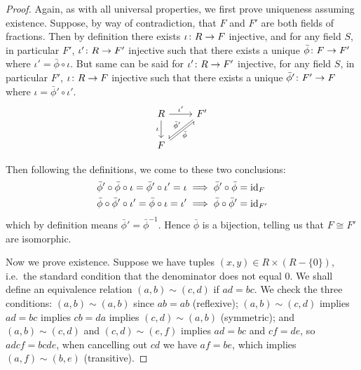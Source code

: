 \begin{proof}
    Again, as with all universal properties,
    we first prove uniqueness assuming existence.
    Suppose, by way of contradiction,
    that \(F\) and \(F'\) are both fields of fractions.
    Then by definition there exists \(\iota\colon R\to F\) injective,
    and for any field \(S\), in particular \(F'\),
    \(\iota'\colon R\to F'\) injective
    such that there exists a unique \(\bar{\phi}\colon F\to F'\)
    where \(\iota' = \bar{\phi}\circ\iota\).
    But same can be said for \(\iota'\colon R\to F'\) injective,
    for any field \(S\), in particular \(F'\),
    \(\iota\colon R\to F\) injective
    such that there exists a unique \(\bar{\phi}'\colon F'\to F\)
    where \(\iota = \bar{\phi}'\circ\iota'\).
    \begin{equation*}
        \begin{tikzcd}
            R \arrow{r}{\iota'} \arrow{d}[swap]{\iota} &
            F' \arrow[rightharpoondown, shift right=0.25ex]{ld}%
                [xshift=.5ex, yshift=-.5ex, swap]{\bar{\phi}'} \\
            F \arrow[rightharpoondown, shift right=0.25ex]{ru}%
                [xshift=-.5ex, yshift=.5ex, swap]{\bar{\phi}}
        \end{tikzcd}
    \end{equation*}

    Then following the definitions,
    we come to these two conclusions:
    \begin{align*}
        \bar{\phi}'\circ\bar{\phi}\circ\iota = \bar{\phi}'\circ\iota' = \iota
        &\implies \bar{\phi}'\circ\bar{\phi} = \operatorname{id}_F \\
        \bar{\phi}\circ\bar{\phi}'\circ\iota' = \bar{\phi}\circ\iota = \iota'
        &\implies \bar{\phi}\circ\bar{\phi}' = \operatorname{id}_{F'}
    \end{align*}
    which by definition means \(\bar{\phi}' = \bar{\phi}^{-1}\).
    Hence \(\bar{\phi}\) is a bijection,
    telling us that \(F \cong F'\) are isomorphic.

    Now we prove existence.
    Suppose we have tuples \((x,y) \in R \times (R - \{0\})\),
    i.e.\ the standard condition that the denominator does not equal 0.
    We shall define an equivalence relation
    \((a,b) \sim (c,d)\) if \(ad = bc\).
    We check the three conditions:
    \((a,b) \sim (a,b)\) since \(ab = ab\) (reflexive);
    \((a,b) \sim (c,d)\) implies \(ad = bc\)
    implies \(cb = da\) implies \((c,d) \sim (a,b)\) (symmetric);
    and \((a,b) \sim (c,d)\) and \((c,d) \sim (e,f)\)
    implies \(ad = bc\) and \(cf = de\),
    so \(adcf = bcde\), when cancelling out \(cd\) we have \(af = be\),
    which implies \((a,f) \sim (b,e)\) (transitive).


\end{proof}
